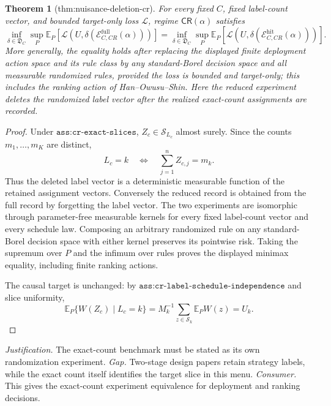 \documentclass{article}
\newtheorem{theorem}{Theorem}
\begin{document}
\begin{theorem}[thm:nuisance-deletion-cr]\label{thm:nuisance-deletion-cr}
For every fixed \(C\), fixed label-count vector, and bounded target-only loss \(\mathcal L\), regime \(\mathsf{CR}(\alpha)\) satisfies
\[
\inf_{\delta\in\mathfrak D_C}\sup_P\mathbb E_P[\mathcal L(U,\delta(\mathcal E_{C,CR}^{\mathrm{full}}(\alpha)))]
=
\inf_{\delta\in\mathfrak D_C}\sup_P\mathbb E_P[\mathcal L(U,\delta(\mathcal E_{C,CR}^{\mathrm{hit}}(\alpha)))].
\]
More generally, the equality holds after replacing the displayed finite deployment action space and its rule class by any standard-Borel decision space and all measurable randomized rules, provided the loss is bounded and target-only; this includes the ranking action of Han--Owusu--Shin.  Here the reduced experiment deletes the randomized label vector after the realized exact-count assignments are recorded.
\end{theorem}
\begin{proof}
Under \(\texttt{ass:cr-exact-slices}\), \(Z_c\in\mathcal S_{L_c}\) almost surely.  Since the counts \(m_1,\ldots,m_K\) are distinct,
\[
 L_c=k\quad\Longleftrightarrow\quad \sum_{j=1}^nZ_{c,j}=m_k. \tag{8}
\]
Thus the deleted label vector is a deterministic measurable function of the retained assignment vectors.  Conversely the reduced record is obtained from the full record by forgetting the label vector.  The two experiments are isomorphic through parameter-free measurable kernels for every fixed label-count vector and every schedule law.  Composing an arbitrary randomized rule on any standard-Borel decision space with either kernel preserves its pointwise risk.  Taking the supremum over \(P\) and the infimum over rules proves the displayed minimax equality, including finite ranking actions.

The causal target is unchanged: by \(\texttt{ass:cr-label-schedule-independence}\) and slice uniformity,
\[
 \mathbb E_P\{W(Z_c)\mid L_c=k\}
 =M_k^{-1}\sum_{z\in\mathcal S_k}\mathbb E_PW(z)=U_k. \tag{9}
\]
\end{proof}
\par\smallskip\noindent \textit{Justification.} The exact-count benchmark must be stated as its own randomization experiment. \textit{Gap.} Two-stage design papers retain strategy labels, while the exact count itself identifies the target slice in this menu. \textit{Consumer.} This gives the exact-count experiment equivalence for deployment and ranking decisions.
\end{document}
